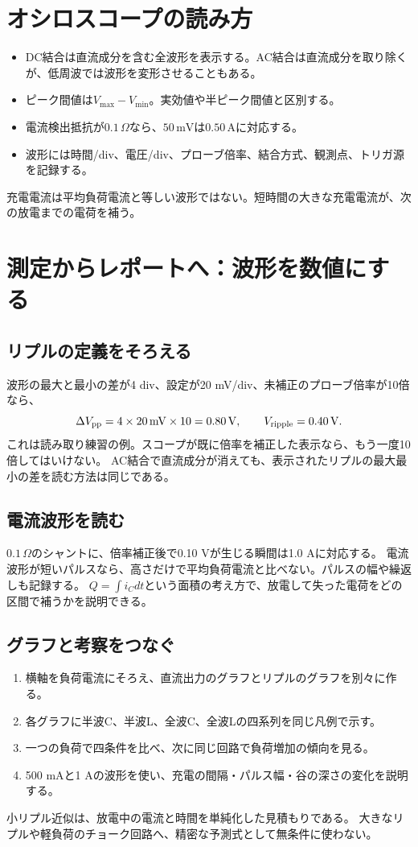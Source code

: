 \documentclass[lualatex,a4paper,10pt]{jlreq}
\begin{document}
\section{オシロスコープの読み方}\label{sec:auto6}
\begin{itemize}
\item DC結合は直流成分を含む全波形を表示する。AC結合は直流成分を取り除くが、低周波では波形を変形させることもある。
\item ピーク間値は$V_{\max}-V_{\min}$。実効値や半ピーク間値と区別する。
\item 電流検出抵抗が$0.1\,\Omega$なら、$50\,\mathrm{mV}$は$0.50\,\mathrm{A}$に対応する。
\item 波形には時間/div、電圧/div、プローブ倍率、結合方式、観測点、トリガ源を記録する。
\end{itemize}
充電電流は平均負荷電流と等しい波形ではない。短時間の大きな充電電流が、次の放電までの電荷を補う。
\section{測定からレポートへ：波形を数値にする}\label{sec:auto7}
\subsection{リプルの定義をそろえる}
波形の最大と最小の差が4 div、設定が20 mV/div、未補正のプローブ倍率が10倍なら、
\[
 \Delta V_{\rm pp}=4\times20\,\mathrm{mV}\times10=0.80\,\mathrm{V},
 \qquad V_{\rm ripple}=0.40\,\mathrm{V}.
\]
これは読み取り練習の例。スコープが既に倍率を補正した表示なら、もう一度10倍してはいけない。
AC結合で直流成分が消えても、表示されたリプルの最大最小の差を読む方法は同じである。
\subsection{電流波形を読む}
$0.1\,\Omega$のシャントに、倍率補正後で0.10 Vが生じる瞬間は1.0 Aに対応する。
電流波形が短いパルスなら、高さだけで平均負荷電流と比べない。パルスの幅や繰返しも記録する。
$Q=\int i_Cdt$という面積の考え方で、放電して失った電荷をどの区間で補うかを説明できる。
\subsection{グラフと考察をつなぐ}
\begin{enumerate}
\item 横軸を負荷電流にそろえ、直流出力のグラフとリプルのグラフを別々に作る。
\item 各グラフに半波C、半波L、全波C、全波Lの四系列を同じ凡例で示す。
\item 一つの負荷で四条件を比べ、次に同じ回路で負荷増加の傾向を見る。
\item 500 mAと1 Aの波形を使い、充電の間隔・パルス幅・谷の深さの変化を説明する。
\end{enumerate}
小リプル近似は、放電中の電流と時間を単純化した見積もりである。
大きなリプルや軽負荷のチョーク回路へ、精密な予測式として無条件に使わない。
\end{document}
